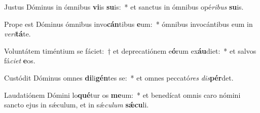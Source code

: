 \item Justus Dóminus in ómnibus \textbf{vi}is \textbf{su}is:~* et sanctus in ómnibus opé\textit{ri}\textit{bus} \textbf{su}is.
\item Prope est Dóminus ómnibus invo\textbf{cán}tibus \textbf{e}um:~* ómnibus invocántibus eum in \textit{ve}\textit{ri}\textbf{tá}te.
\item Voluntátem timéntium se fáciet:~† et deprecatiónem e\textbf{ó}rum ex\textbf{áu}diet:~* et salvos fá\textit{ci}\textit{et} \textbf{e}os.
\item Custódit Dóminus omnes \textbf{di}li\textbf{gén}tes se:~* et omnes peccató\textit{res} \textit{dis}\textbf{pér}det.
\item Laudatiónem Dómini lo\textbf{qué}tur os \textbf{me}um:~* et benedícat omnis caro nómini sancto ejus in sǽculum, et in sǽ\textit{cu}\textit{lum} \textbf{sǽ}\textbf{cu}li.
